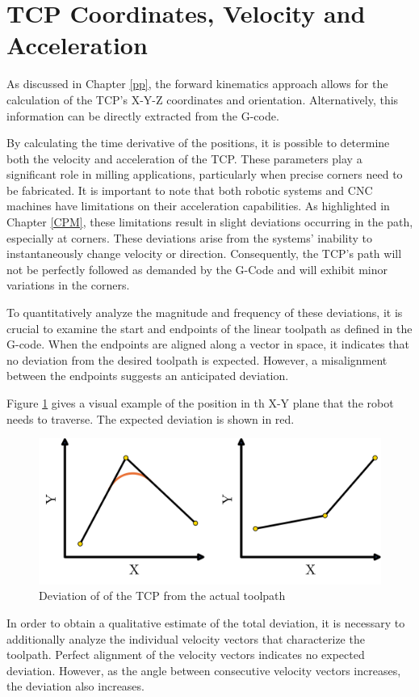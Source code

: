 \section{TCP Coordinates, Velocity and Acceleration}\label{CVA}
As discussed in Chapter \ref{pp}, the forward kinematics approach allows for the calculation of the \acrshort{TCP}'s X-Y-Z coordinates and orientation. Alternatively, this information can be directly extracted from the G-code.

By calculating the time derivative of the positions, it is possible to determine both the velocity and acceleration of the \acrshort{TCP}. These parameters play a significant role in milling applications, particularly when precise corners need to be fabricated. It is important to note that both robotic systems and \acrshort{CNC} machines have limitations on their acceleration capabilities. As highlighted in Chapter \ref{CPM}, these limitations result in slight deviations occurring in the path, especially at corners. These deviations arise from the systems' inability to instantaneously change velocity or direction. Consequently, the \acrshort{TCP}'s path will not be perfectly followed as demanded by the G-Code and will exhibit minor variations in the corners.

To quantitatively analyze the magnitude and frequency of these deviations, it is crucial to examine the start and endpoints of the linear toolpath as defined in the G-code. When the endpoints are aligned along a vector in space, it indicates that no deviation from the desired toolpath is expected. However, a misalignment between the endpoints suggests an anticipated deviation.

Figure \ref{devi} gives a visual example of the position in th X-Y plane that the robot needs to traverse. The expected deviation is shown in red.

\begin{figure}[H]
	\centerline{\includegraphics[width=.5\textwidth]{figures/uber.png}}
	\caption{Deviation of of the TCP from the actual toolpath}
	\label{devi}
\end{figure}

In order to obtain a qualitative estimate of the total deviation, it is necessary to additionally analyze the individual velocity vectors that characterize the toolpath. Perfect alignment of the velocity vectors indicates no expected deviation. However, as the angle between consecutive velocity vectors increases, the deviation also increases.

